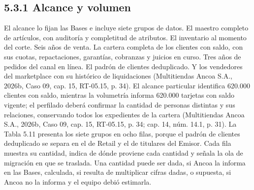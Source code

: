 \documentclass[11pt]{article}
\begin{document}
\subsection{5.3.1 Alcance y volumen}

El alcance lo fijan las Bases e incluye siete grupos de datos. El maestro completo de artículos, con auditoría y completitud de atributos. El inventario al momento del corte. Seis años de venta. La cartera completa de los clientes con saldo, con sus cuotas, repactaciones, garantías, cobranzas y juicios en curso. Tres años de pedidos del canal en línea. El padrón de clientes deduplicado. Y los vendedores del marketplace con su histórico de liquidaciones (Multitiendas Ancoa S.A., 2026b, Caso 09, cap. 15, RT-05.15, p. 34). El alcance particular identifica 620.000 clientes con saldo, mientras la volumetría informa 620.000 tarjetas con saldo vigente; el perfilado deberá confirmar la cantidad de personas distintas y sus relaciones, conservando todos los expedientes de la cartera (Multitiendas Ancoa S.A., 2026b, Caso 09, cap. 15, RT-05.15, p. 34; cap. 14, núm. 14.1, p. 31). La Tabla 5.11 presenta los siete grupos en ocho filas, porque el padrón de clientes deduplicado se separa en el de Retail y el de titulares del Emisor. Cada fila muestra su cantidad, indica de dónde proviene cada cantidad y señala la ola de migración en que se traslada. Una cantidad puede ser dada, si Ancoa la informa en las Bases, calculada, si resulta de multiplicar cifras dadas, o supuesta, si Ancoa no la informa y el equipo debió estimarla.

\par\vspace{0pt plus 54\baselineskip}\vspace{0pt plus -54\baselineskip}
\end{document}
